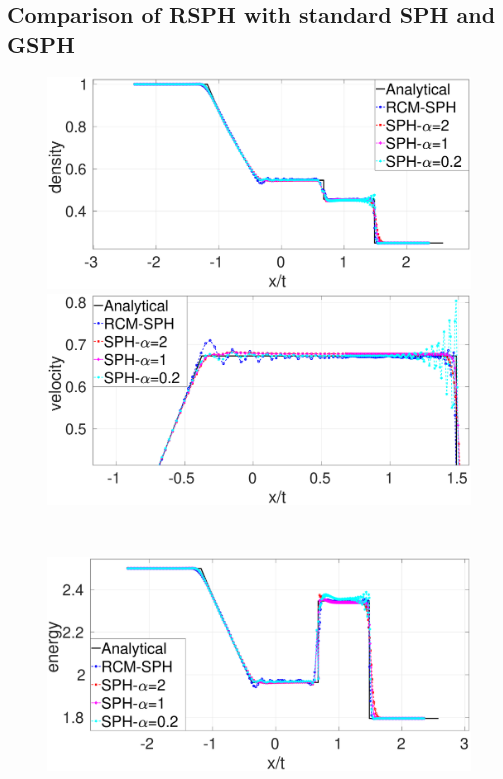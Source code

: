 \subsection{Comparison of RSPH with standard SPH and GSPH}
\begin{figure}
    \centering
    \begin{minipage}{.495\textwidth}
        \centering
        \includegraphics[width=0.99 \textwidth]{Chapter-4/Figures/Sod/RCM-Sod-SPH-alf-rho}
    \end{minipage}%
    \begin{minipage}{.495 \textwidth}
        \centering
        \includegraphics[width=0.99 \textwidth]{Chapter-4/Figures/Sod/RCM-Sod-SPH-alf-v}
    \end{minipage}%
    \\
    \begin{minipage}{.495\textwidth}
        \centering
        \includegraphics[width=0.99 \textwidth]{Chapter-4/Figures/Sod/RCM-Sod-SPH-alf-e}

\end{minipage}
\end{figure}
